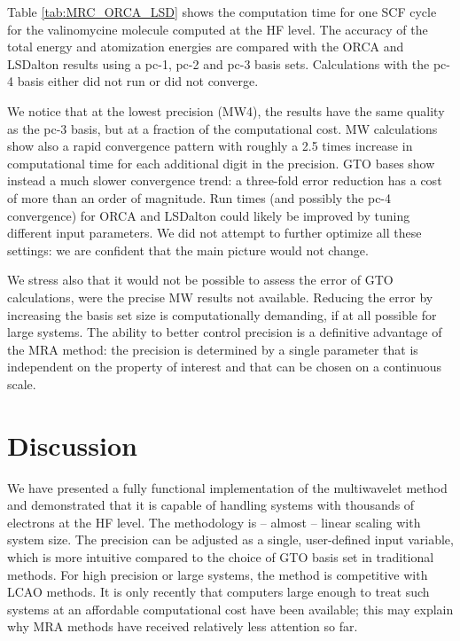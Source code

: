 \documentclass[journal=jctcce, manuscript=article]{achemso}
\begin{document}
Table \ref{tab:MRC_ORCA_LSD} shows the computation time for one
\ac{SCF} cycle for the valinomycine molecule computed at the
\ac{HF} level. The accuracy of the total energy and atomization
energies are compared with the ORCA and LSDalton results using a pc-1,
pc-2 and pc-3 basis sets. Calculations with the pc-4 basis either did not run or did not converge.

We notice that at the lowest precision (MW4), the results have
the same quality as the pc-3 basis, but at a fraction of the computational
cost. \ac{MW} calculations show also a rapid convergence pattern with
roughly a 2.5 times increase in computational time for each
additional digit in the precision. \ac{GTO} bases show instead a much
slower convergence trend: a three-fold error reduction has a cost of
more than an order of magnitude. Run times (and possibly the pc-4 convergence) for ORCA\cite{Neese2022-ub}
and LSDalton\cite{Aidas2014-rp} could likely be improved by tuning
different input parameters. We did not attempt to further optimize all
these settings: we are confident that the main picture would not
change.

We stress also that it would not be possible to assess the error of
\ac{GTO} calculations, were the precise \ac{MW} results not available.
Reducing the error by increasing the basis set size is computationally
demanding, if at all possible for large systems.
The ability to better control precision is a definitive advantage of the \ac{MRA} method:
the precision is determined by a single parameter that is independent on the property of interest and that can be chosen on a continuous scale.

\section{Discussion}

We have presented a fully functional implementation of the
multiwavelet method and demonstrated that it is capable of handling
systems with thousands of electrons at the \ac{HF}
level. The methodology is -- almost -- linear scaling with
system size. The precision can be adjusted as a single, user-defined input variable,
which is more intuitive compared to the choice of \ac{GTO} basis set
in traditional methods. For high precision or large systems, the
method is competitive with \ac{LCAO}
methods. It is only recently that computers large enough to treat such
systems at an affordable computational cost have been available; this
may explain why \ac{MRA} methods have received relatively less attention so
far.
\end{document}
